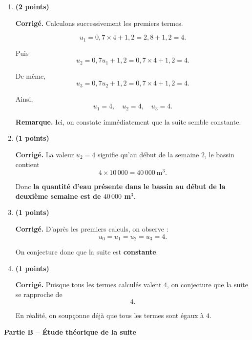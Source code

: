 \documentclass[11pt,a4paper]{article}
\newcommand{\bareme}[1]{\hfill{\color{blue!70!black}\textbf{(#1 points)}}}
\newcommand{\corr}{\noindent\textcolor{blue!70!black}{\textbf{Corrigé. }}}
\newcommand{\rem}{\noindent\textcolor{red!70!black}{\textbf{Remarque. }}}
\begin{document}
\begin{enumerate}[label=\textbf{A.\arabic*.}, leftmargin=0.9cm]

\item \bareme{2}

\corr Calculons successivement les premiers termes.

\[
u_1=0{,}7\times 4+1{,}2=2{,}8+1{,}2=4.
\]

Puis
\[
u_2=0{,}7u_1+1{,}2=0{,}7\times 4+1{,}2=4.
\]

De même,
\[
u_3=0{,}7u_2+1{,}2=0{,}7\times 4+1{,}2=4.
\]

Ainsi,
\[
\boxed{u_1=4,\quad u_2=4,\quad u_3=4.}
\]

\rem Ici, on constate immédiatement que la suite semble constante.

\item \bareme{1}

\corr La valeur $u_2=4$ signifie qu’au début de la semaine $2$, le bassin contient
\[
4\times 10\,000=40\,000\ \text{m}^3.
\]

Donc \textbf{la quantité d’eau présente dans le bassin au début de la deuxième semaine est de $40\,000$ m$^3$}.

\item \bareme{1}

\corr D’après les premiers calculs, on observe :
\[
u_0=u_1=u_2=u_3=4.
\]

On conjecture donc que la suite est \textbf{constante}.

\item \bareme{1}

\corr Puisque tous les termes calculés valent $4$, on conjecture que la suite se rapproche de
\[
\boxed{4.}
\]

En réalité, on soupçonne déjà que tous les termes sont égaux à $4$.

\end{enumerate}

\medskip

\textbf{Partie B -- Étude théorique de la suite}
\end{document}
